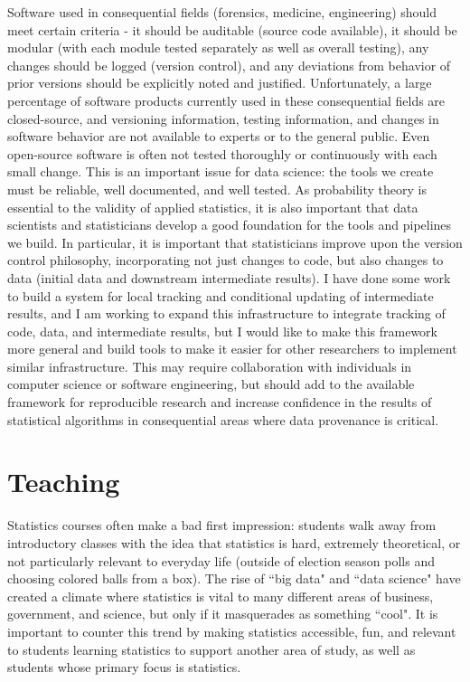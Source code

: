 \documentclass[12pt, letterpaper, sans]{moderncv}
\begin{document}
Software used in consequential fields (forensics, medicine, engineering) should meet certain criteria - it should be auditable (source code available), it should be modular (with each module tested separately as well as overall testing), any changes should be logged (version control), and any deviations from behavior of prior versions should be explicitly noted and justified. Unfortunately, a large percentage of software products currently used in these consequential fields are closed-source, and versioning information, testing information, and changes in software behavior are not available to experts or to the general public. Even open-source software is often not tested thoroughly or continuously with each small change. This is an important issue for data science: the tools we create must be reliable, well documented, and well tested. As probability theory is essential to the validity of applied statistics, it is also important that data scientists and statisticians develop a good foundation for the tools and pipelines we build. In particular, it is important that statisticians improve upon the version control philosophy, incorporating not just changes to code, but also changes to data (initial data and downstream intermediate results). I have done some work to build a system for local tracking and conditional updating of intermediate results, and I am working to expand this infrastructure to integrate tracking of code, data, and intermediate results, but I would like to make this framework more general and build tools to make it easier for other researchers to implement similar infrastructure. This may require collaboration with individuals in computer science or software engineering, but should add to the available framework for reproducible research and increase confidence in the results of statistical algorithms in consequential areas where data provenance is critical. 
\clearpage
\section{Teaching}

Statistics courses often make a bad first impression: students walk away from introductory classes with the idea that statistics is hard, extremely theoretical, or not particularly relevant to everyday life (outside of election season polls and choosing colored balls from a box). The rise of ``big data" and ``data science" have created a climate where statistics is vital to many different areas of business, government, and science, but only if it masquerades as something ``cool". It is important to counter this trend by making statistics accessible, fun, and relevant to students learning statistics to support another area of study, as well as students whose primary focus is statistics. 
\end{document}

